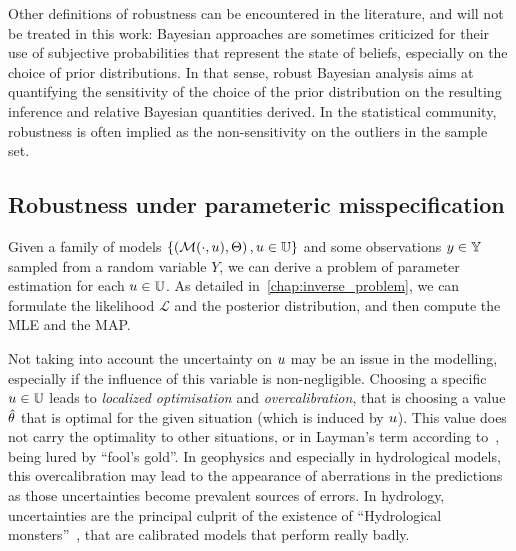 \documentclass[../../Main_ManuscritThese.tex]{subfiles}
\begin{document}
Other definitions of robustness can be encountered in the literature, and will not be treated in this work: Bayesian approaches are sometimes criticized for their use of subjective probabilities that represent the state of beliefs, especially on the choice of prior distributions. In that sense, robust Bayesian analysis aims at quantifying the sensitivity of the choice of the prior distribution on the resulting inference and relative Bayesian quantities derived. In the statistical community, robustness is often implied as the non-sensitivity on the outliers in the sample set.



\subsection{Robustness under parameteric misspecification}

Given a family of models $\left\{\left(\mathcal{M}(\cdot, u), \Theta\right), u\in\mathbb{U}\right\}$ and some observations $y\in \mathbb{Y}$ sampled from a random variable $Y$, we can derive a problem of parameter estimation for each $u \in \mathbb{U}$. As detailed in~\cref{chap:inverse_problem}, we can formulate the likelihood $\mathcal{L}$ and the posterior distribution, and then compute the MLE and the MAP.\@



Not taking into account the uncertainty on $u$ may be an issue in
the modelling, especially if the influence of this variable is
non-negligible.  Choosing a specific $u \in \mathbb{U}$ leads to
\emph{localized optimisation} \citep{huyse_free-form_2001} and
\emph{overcalibration}, that is choosing a value $\hat{\theta}$ that is
optimal for the given situation (which is induced by $u$). This
value does not carry the optimality to other situations, or in
Layman's term according to~\cite{andreassian_all_2012}, being lured by
``fool's gold''.  In geophysics and especially in hydrological models,
this overcalibration may lead to the appearance of aberrations in the
predictions as those uncertainties become prevalent sources of
errors. In hydrology, uncertainties are the principal culprit of the
existence of ``Hydrological monsters''~\citep{kuczera_there_2010},
that are calibrated models that perform really badly.
\end{document}
